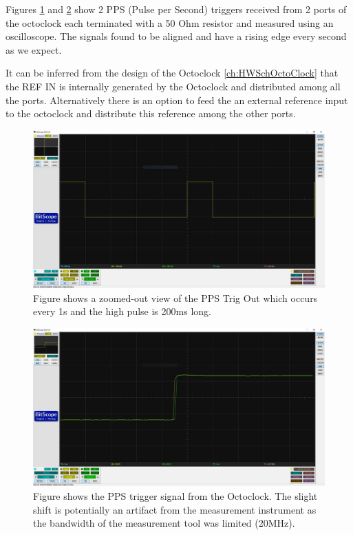 Figures \ref{fig:PPSTrig} and \ref{fig:PPSTrigZoomedIn} show 2 PPS (Pulse per Second) triggers received from 2 ports of the octoclock each terminated with a 50 Ohm resistor and measured using an oscilloscope. The signals found to be aligned and have a rising edge every second as we expect.

It can be inferred from the design of the Octoclock \ref{ch:HWSchOctoClock} that the REF IN is internally generated by the Octoclock and distributed among all the ports. Alternatively there is an option to feed the an external reference input to the octoclock and distribute this reference among the other ports.

\begin{figure}[H]
    \centering
    \includegraphics[width=\linewidth]{images/PPSTrig.jpg}
    \caption{Figure shows a zoomed-out view of the PPS Trig Out which occurs every 1s and the high pulse is 200ms long.}
    \label{fig:PPSTrig}%
\end{figure}

\begin{figure}[htb]
    \centering
    \includegraphics[width=\linewidth]{images/PPSTrigZoomIn.jpg}
    \caption{Figure shows the PPS trigger signal from the Octoclock. The slight shift is potentially an artifact from the measurement instrument as the bandwidth of the measurement tool was limited (20MHz).}
    \label{fig:PPSTrigZoomedIn}%
\end{figure}


